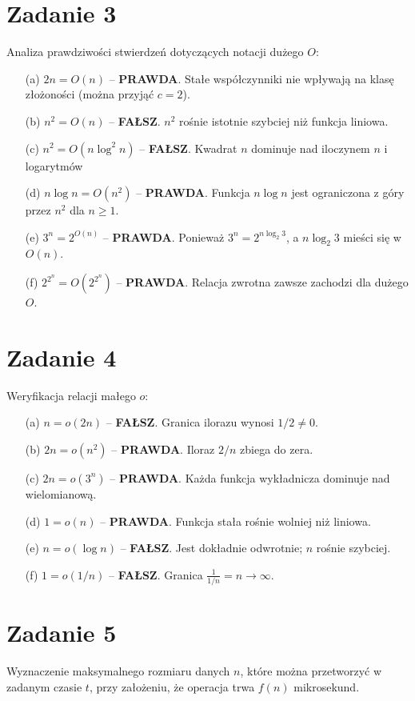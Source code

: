 \documentclass{article}
\begin{document}
\section{Zadanie 3}
Analiza prawdziwości stwierdzeń dotyczących notacji dużego $O$:

\begin{itemize}
    \item[(a)] $2n = O(n)$ -- \textbf{PRAWDA}. Stałe współczynniki nie wpływają na klasę złożoności (można przyjąć $c=2$).
    \item[(b)] $n^2 = O(n)$ -- \textbf{FAŁSZ}. $n^2$ rośnie istotnie szybciej niż funkcja liniowa.
    \item[(c)] $n^2 = O(n \log^2 n)$ -- \textbf{FAŁSZ}. Kwadrat $n$ dominuje nad iloczynem $n$ i logarytmów
    \item[(d)] $n \log n = O(n^2)$ -- \textbf{PRAWDA}. Funkcja $n \log n$ jest ograniczona z góry przez $n^2$ dla $n \ge 1$.
    \item[(e)] $3^n = 2^{O(n)}$ -- \textbf{PRAWDA}. Ponieważ $3^n = 2^{n \log_2 3}$, a $n \log_2 3$ mieści się w $O(n)$.
    \item[(f)] $2^{2^n} = O(2^{2^n})$ -- \textbf{PRAWDA}. Relacja zwrotna zawsze zachodzi dla dużego $O$.
\end{itemize}

\section{Zadanie 4}
Weryfikacja relacji małego $o$:

\begin{itemize}
    \item[(a)] $n = o(2n)$ -- \textbf{FAŁSZ}. Granica ilorazu wynosi $1/2 \neq 0$.
    \item[(b)] $2n = o(n^2)$ -- \textbf{PRAWDA}. Iloraz $2/n$ zbiega do zera.
    \item[(c)] $2n = o(3^n)$ -- \textbf{PRAWDA}. Każda funkcja wykładnicza dominuje nad wielomianową.
    \item[(d)] $1 = o(n)$ -- \textbf{PRAWDA}. Funkcja stała rośnie wolniej niż liniowa.
    \item[(e)] $n = o(\log n)$ -- \textbf{FAŁSZ}. Jest dokładnie odwrotnie; $n$ rośnie szybciej.
    \item[(f)] $1 = o(1/n)$ -- \textbf{FAŁSZ}. Granica $\frac{1}{1/n} = n \to \infty$.
\end{itemize}

\section{Zadanie 5}
Wyznaczenie maksymalnego rozmiaru danych $n$, które można przetworzyć w zadanym czasie $t$, przy założeniu, że operacja trwa $f(n)$ mikrosekund.
\end{document}
